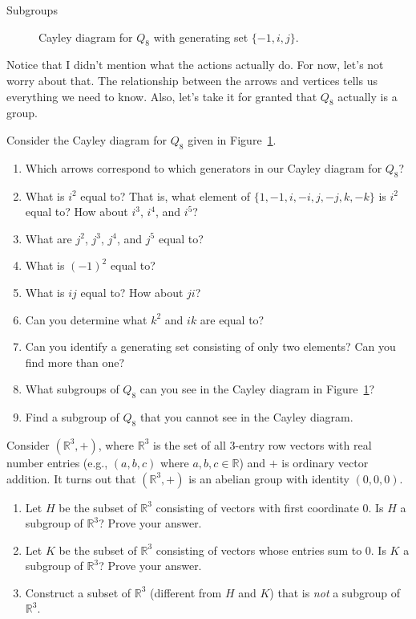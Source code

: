 \begin{section}{Subgroups}
\begin{figure}[!ht]
\begin{tikzpicture}[scale=1.5,auto]
\end{tikzpicture}
\caption{Cayley diagram for $Q_8$ with generating set $\{-1, i, j\}$.}\label{fig:Q8}
\end{figure}

Notice that I didn't mention what the actions actually do.  For now, let's not worry about that.  The relationship between the arrows and vertices tells us everything we need to know.  Also, let's take it for granted that $Q_8$ actually is a group.

\begin{problem}
Consider the Cayley diagram for $Q_8$ given in Figure~\ref{fig:Q8}.
\begin{enumerate}[label=\rm{(\alph*)}]
\item Which arrows correspond to which generators in our Cayley diagram for $Q_8$?
\item What is $i^2$ equal to?  That is, what element of $\{1,-1,i,-i,j,-j,k,-k\}$ is $i^2$ equal to?  How about $i^3$, $i^4$, and $i^5$?
\item What are $j^2$, $j^3$, $j^4$, and $j^5$ equal to?
\item What is $(-1)^2$ equal to?
\item What is $ij$ equal to?  How about $ji$?
\item Can you determine what $k^2$ and $ik$ are equal to?
\item Can you identify a generating set consisting of only two elements?  Can you find more than one?
\item What subgroups of $Q_8$ can you see in the Cayley diagram in Figure~\ref{fig:Q8}?
\item Find a subgroup of $Q_8$ that you cannot see in the Cayley diagram.
\end{enumerate}
\end{problem}

\begin{problem}
Consider $(\mathbb{R}^3,+)$, where $\mathbb{R}^3$ is the set of all 3-entry row vectors with real number entries (e.g., $(a,b,c)$ where $a,b,c\in\mathbb{R}$) and $+$ is ordinary vector addition.  It turns out that $(\mathbb{R}^3,+)$ is an abelian group with identity $(0,0,0)$.  
\begin{enumerate}[label=\rm{(\alph*)}]
\item Let $H$ be the subset of $\mathbb{R}^3$ consisting of vectors with first coordinate 0.  Is $H$ a subgroup of $\mathbb{R}^3$?  Prove your answer.
\item Let $K$ be the subset of $\mathbb{R}^3$ consisting of vectors whose entries sum to 0.  Is $K$ a subgroup of $\mathbb{R}^3$?  Prove your answer.
\item Construct a subset of $\mathbb{R}^3$ (different from $H$ and $K$) that is \emph{not} a subgroup of $\mathbb{R}^3$.
\end{enumerate}
\end{problem}


\end{section}
